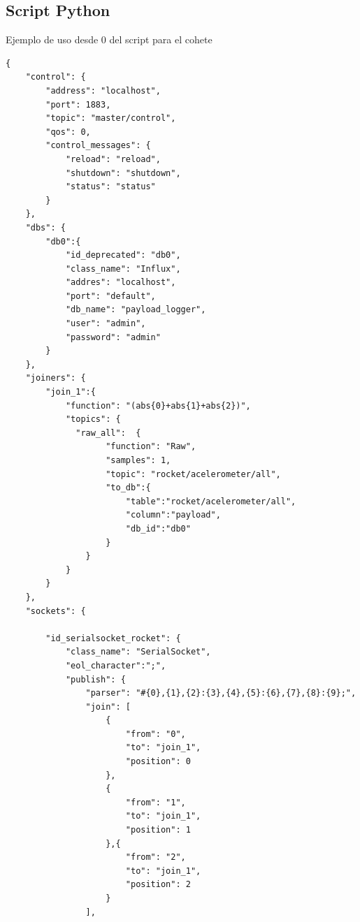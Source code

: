\documentclass[12pt, a4paper, oneside, titlepage]{article}
\begin{document}
\subsection{Script Python}
Ejemplo de uso desde 0 del script para el cohete

\begin{lstlisting}
{
	"control": {
		"address": "localhost",
		"port": 1883,
		"topic": "master/control",
		"qos": 0,
		"control_messages": {
			"reload": "reload",
			"shutdown": "shutdown",
			"status": "status"
		}
	},
	"dbs": {
		"db0":{
			"id_deprecated": "db0",
			"class_name": "Influx",
			"addres": "localhost",
			"port": "default",
			"db_name": "payload_logger",
			"user": "admin",
			"password": "admin"
		}
	},
	"joiners": {
		"join_1":{
			"function": "(abs{0}+abs{1}+abs{2})",
			"topics": {
			  "raw_all":  {
					"function": "Raw",
					"samples": 1,
					"topic": "rocket/acelerometer/all",
					"to_db":{
						"table":"rocket/acelerometer/all",
						"column":"payload",
						"db_id":"db0"
					}
				}
			}
		}
	},
	"sockets": {

		"id_serialsocket_rocket": {
			"class_name": "SerialSocket",
			"eol_character":";",
			"publish": {
				"parser": "#{0},{1},{2}:{3},{4},{5}:{6},{7},{8}:{9};",
				"join": [
					{
						"from": "0",
						"to": "join_1",
						"position": 0
					},
					{
						"from": "1",
						"to": "join_1",
						"position": 1
					},{
						"from": "2",
						"to": "join_1",
						"position": 2
					}
				],


\end{lstlisting}
\end{document}
